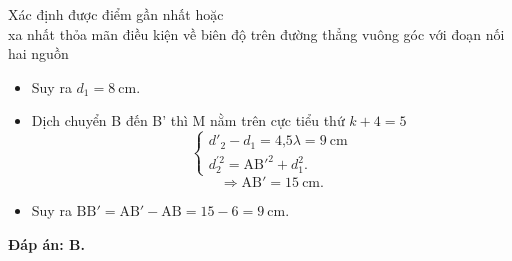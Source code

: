\begin{dang}{Xác định được điểm gần nhất hoặc\\ xa nhất thỏa mãn điều kiện về biên độ trên đường thẳng vuông góc với đoạn nối hai nguồn}
{\begin{itemize}
			\begin{equation*}
				\begin{cases}
					d_2-d_1=\lambda = 2\ \text{cm}\\
					d_1^2+6^2=d_2^2
				\end{cases}
			\end{equation*}
			\begin{equation*}
				\Rightarrow d_1^2+6^2 = (d_1+2)^2.
			\end{equation*}
			\item Suy ra $d_1=8\ \text{cm}$.
			\item Dịch chuyển B đến B' thì M nằm trên cực tiểu thứ $k+4=5$
			\begin{equation*}
				\begin{cases}
					d'_2-d_1=\text{4,5}\lambda = 9\ \text{cm}\\
					d_2^{'2}=\text{AB}'^2+d_1^2.
				\end{cases}
			\end{equation*}
			\begin{equation*}
				\Rightarrow \text{AB}'=15\ \text{cm}. 
			\end{equation*}
			\item Suy ra $\text{BB}'=\text{AB}'-\text{AB}=15-6=9\ \text{cm}$.
		\end{itemize}
		
		\textbf{Đáp án: B.}
	}
\end{dang}
